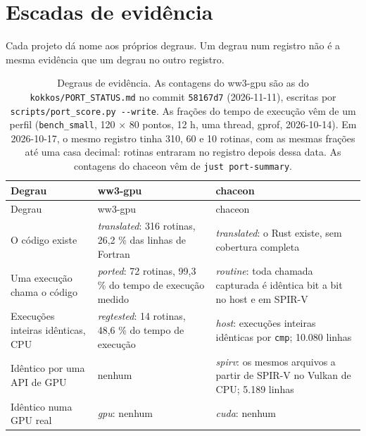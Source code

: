 \documentclass[10pt,a4paper,]{article}
\begin{document}
\section{Escadas de evidência}\label{sec:ladders}

Cada projeto dá nome aos próprios degraus. Um degrau num registro não é
a mesma evidência que um degrau no outro registro.

\begin{longtable}[]{@{}
  >{\raggedright\arraybackslash}p{}
  >{\raggedright\arraybackslash}p{}
  >{\raggedright\arraybackslash}p{}@{}}
\caption{\label{tbl:ladders}Degraus de evidência. As contagens do
ww3-gpu são as do \texttt{kokkos/PORT\_STATUS.md} no commit
\texttt{58167d7} (2026-11-11), escritas por
\texttt{scripts/port\_score.py\ -\/-write}. As frações do tempo de
execução vêm de um perfil (\texttt{bench\_small}, 120 × 80 pontos, 12 h,
uma thread, gprof, 2026-10-14). Em 2026-10-17, o mesmo registro tinha
310, 60 e 10 rotinas, com as mesmas frações até uma casa decimal:
rotinas entraram no registro depois dessa data. As contagens do chaceon
vêm de \texttt{just\ port-summary}.}\tabularnewline
\toprule\noalign{}
\begin{minipage}[b]{\linewidth}\raggedright
Degrau
\end{minipage} & \begin{minipage}[b]{\linewidth}\raggedright
ww3-gpu
\end{minipage} & \begin{minipage}[b]{\linewidth}\raggedright
chaceon
\end{minipage} \\
\midrule\noalign{}
\endfirsthead
\toprule\noalign{}
\begin{minipage}[b]{\linewidth}\raggedright
Degrau
\end{minipage} & \begin{minipage}[b]{\linewidth}\raggedright
ww3-gpu
\end{minipage} & \begin{minipage}[b]{\linewidth}\raggedright
chaceon
\end{minipage} \\
\midrule\noalign{}
\endhead
\bottomrule\noalign{}
\endlastfoot
O código existe & \emph{translated}: 316 rotinas, 26,2 \% das linhas de
Fortran & \emph{translated}: o Rust existe, sem cobertura completa \\
Uma execução chama o código & \emph{ported}: 72 rotinas, 99,3 \% do
tempo de execução medido & \emph{routine}: toda chamada capturada é
idêntica bit a bit no host e em SPIR-V \\
Execuções inteiras idênticas, CPU & \emph{regtested}: 14 rotinas, 48,6
\% do tempo de execução & \emph{host}: execuções inteiras idênticas por
\texttt{cmp}; 10.080 linhas \\
Idêntico por uma API de GPU & nenhum & \emph{spirv}: os mesmos arquivos
a partir de SPIR-V no Vulkan de CPU; 5.189 linhas \\
Idêntico numa GPU real & \emph{gpu}: nenhum & \emph{cuda}: nenhum \\
\end{longtable}
\end{document}

